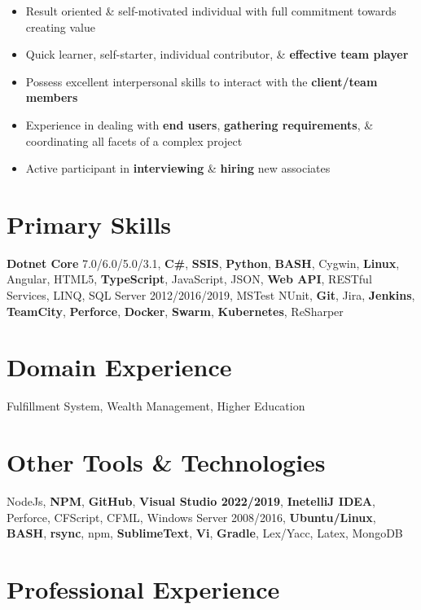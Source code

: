 \documentclass[letterpaper,11pt]{article}
\begin{document}
\begin{itemize}
    \item Result oriented \& self-motivated individual with full commitment towards creating value
    \item Quick learner, self-starter, individual contributor, \& \textbf{effective team player}
    \item Possess excellent interpersonal skills to interact with the \textbf{client/team members}
    \item Experience in dealing with \textbf{end users}, \textbf{gathering requirements}, \& coordinating all facets of a complex project
    \item Active participant in \textbf{interviewing} \& \textbf{hiring} new associates
\end{itemize}
\pagebreak

\section{Primary Skills}
\textbf{Dotnet Core} 7.0/6.0/5.0/3.1, \textbf{C\#}, \textbf{SSIS}, \textbf{Python}, \textbf{BASH}, Cygwin, \textbf{Linux}, Angular, HTML5, \textbf{TypeScript}, JavaScript, JSON, \textbf{Web API}, RESTful Services, LINQ, SQL Server 2012/2016/2019, MSTest NUnit, \textbf{Git}, Jira, \textbf{Jenkins}, \textbf{TeamCity}, \textbf{Perforce}, \textbf{Docker}, \textbf{Swarm}, \textbf{Kubernetes}, ReSharper

\section{Domain Experience}
Fulfillment System, Wealth Management, Higher Education

\section{Other Tools \& Technologies}
NodeJs, \textbf{NPM}, \textbf{GitHub}, \textbf{Visual Studio 2022/2019}, \textbf{InetelliJ IDEA}, Perforce, CFScript, CFML, Windows Server 2008/2016, \textbf{Ubuntu/Linux}, \textbf{BASH}, \textbf{rsync}, npm, \textbf{SublimeText}, \textbf{Vi}, \textbf{Gradle}, Lex/Yacc, Latex, MongoDB

\section{Professional Experience}

\end{document}
